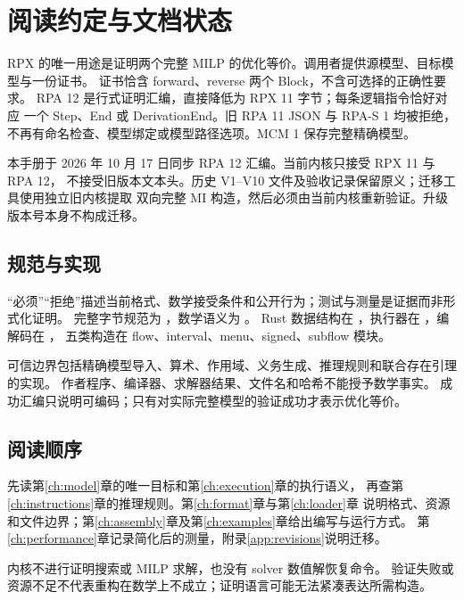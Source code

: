 \chapter*{阅读约定与文档状态}

RPX 的唯一用途是证明两个完整 MILP 的优化等价。调用者提供源模型、目标模型与一份证书。
证书恰含 forward、reverse 两个 Block，不含可选择的正确性要求。
RPA 12 是行式证明汇编，直接降低为 RPX 11 字节；每条逻辑指令恰好对应
一个 Step、End 或 DerivationEnd。旧 RPA 11 JSON 与 RPA-S 1 均被拒绝，
不再有命名检查、模型绑定或模型路径选项。MCM 1 保存完整精确模型。

本手册于 2026 年 10 月 17 日同步 RPA 12 汇编。当前内核只接受 RPX 11 与 RPA 12，
不接受旧版本文本头。历史 V1--V10 文件及验收记录保留原义；迁移工具使用独立旧内核提取
双向完整 MI 构造，然后必须由当前内核重新验证。升级版本号本身不构成迁移。

\section*{规范与实现}
“必须”“拒绝”描述当前格式、数学接受条件和公开行为；测试与测量是证据而非形式化证明。
完整字节规范为 ，数学语义为 。
Rust 数据结构在 ，执行器在 ，编解码在 ，
五类构造在 flow、interval、menu、signed、subflow 模块。

可信边界包括精确模型导入、算术、作用域、义务生成、推理规则和联合存在引理的实现。
作者程序、编译器、求解器结果、文件名和哈希不能授予数学事实。
成功汇编只说明可编码；只有对实际完整模型的验证成功才表示优化等价。

\section*{阅读顺序}
先读第\ref{ch:model}章的唯一目标和第\ref{ch:execution}章的执行语义，
再查第\ref{ch:instructions}章的推理规则。第\ref{ch:format}章与第\ref{ch:loader}章
说明格式、资源和文件边界；第\ref{ch:assembly}章及第\ref{ch:examples}章给出编写与运行方式。
第\ref{ch:performance}章记录简化后的测量，附录\ref{app:revisions}说明迁移。

内核不进行证明搜索或 MILP 求解，也没有 solver 数值解恢复命令。
验证失败或资源不足不代表重构在数学上不成立；证明语言可能无法紧凑表达所需构造。
